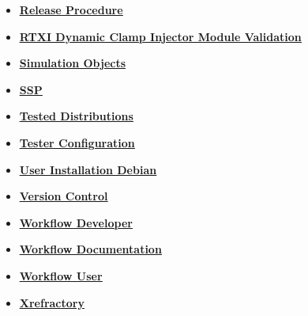 \documentclass[12pt]{article}
\begin{document}
\begin{itemize}
\item \href{../release-procedure/release-procedure.pdf}{\bf \underline{Release Procedure}}

\item \href{../rtxi-injector-validation/rtxi-injector-validation.pdf}{\bf \underline{RTXI Dynamic Clamp Injector Module Validation}}

\item \href{../simulation-objects/simulation-objects.pdf}{\bf \underline{Simulation Objects}}

\item \href{../ssp/ssp.pdf}{\bf \underline{SSP}}

\item \href{../tested-distributions/tested-distributions.pdf}{\bf \underline{Tested Distributions}}

\item \href{../tester-configuration/tester-configuration.pdf}{\bf \underline{Tester Configuration}}

\item \href{../installation-debian/installation-debian.pdf}{\bf \underline{User Installation Debian}}

\item \href{../version-control/version-control.pdf}{\bf \underline{Version Control}}

\item \href{../workflow-developer/workflow-developer.pdf}{\bf \underline{Workflow Developer}}

\item \href{../workflow-documentation/workflow-documentation.pdf}{\bf \underline{Workflow Documentation}}

\item \href{../workflow-user/workflow-user.pdf}{\bf \underline{Workflow User}}

\item \href{../cxref/cxref.pdf}{\bf \underline{Xrefractory}}


\end{itemize}

\end{document}
